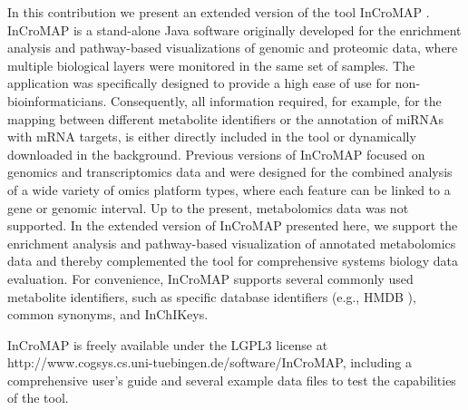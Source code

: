 \documentclass[final,5p,times,twocolumn]{elsarticle}
\begin{document}
In this contribution we present an extended version of the tool InCroMAP \cite{Wrzodek2012a,Wrzodek2012b}. InCroMAP is a stand-alone Java software originally developed for the enrichment analysis and pathway-based visualizations of genomic and proteomic data, where multiple biological layers were monitored in the same set of samples. The application was specifically designed to provide a high ease of use for non-bioinformaticians. Consequently, all information required, for example, for the mapping between different metabolite identifiers or the annotation of miRNAs with mRNA targets, is either directly included in the tool or dynamically downloaded in the background. Previous versions of InCroMAP focused on genomics and transcriptomics data and were designed for the combined analysis of a wide variety of omics platform types, where each feature can be linked to a gene or genomic interval. Up to the present, metabolomics data was not supported. In the extended version of InCroMAP presented here, we support the enrichment analysis and pathway-based visualization of annotated metabolomics data and thereby complemented the tool for comprehensive systems biology data evaluation. For convenience, InCroMAP supports several commonly used metabolite identifiers, such as specific database identifiers (e.g., HMDB \cite{Wishart2009}), common synonyms, and InChIKeys. 

InCroMAP is freely available under the LGPL3 license at http://www.cogsys.cs.uni-tuebingen.de/software/InCroMAP, including a comprehensive user’s guide and several example data files to test the capabilities of the tool.
\end{document}
